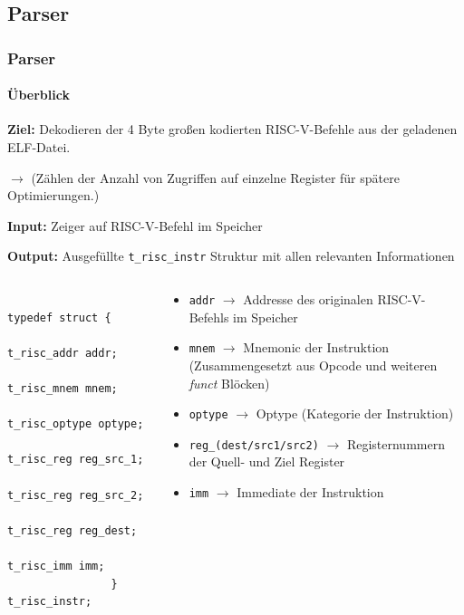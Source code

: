 \documentclass[german]{tum-presentation}
\newcommand{\refer}[0]{\ensuremath{\rightarrow} }
\begin{document}
\subsection{Parser} %
\begin{frame}[fragile]
	\frametitle{Parser}
	\framesubtitle{Überblick}
	\textbf{Ziel:} Dekodieren der 4 Byte großen kodierten RISC-V-Befehle aus der geladenen ELF-Datei.

	\refer (Zählen der Anzahl von Zugriffen auf einzelne Register für spätere Optimierungen.)

	\vspace{0.25cm}
	\textbf{Input:} Zeiger auf RISC-V-Befehl im Speicher

	\textbf{Output:} Ausgefüllte \verb!t_risc_instr! Struktur mit allen relevanten Informationen
	
	\pause

	\begin{columns}
		\begin{column}{0.4\textwidth}
			\begin{lstlisting}
				typedef struct {
				    t_risc_addr addr;
				    t_risc_mnem mnem;
				    t_risc_optype optype;
				    t_risc_reg reg_src_1;
				    t_risc_reg reg_src_2;
				    t_risc_reg reg_dest;
				    t_risc_imm imm;
				} t_risc_instr;
			\end{lstlisting}
		\end{column}
		\begin{column}{0.6\textwidth}
			\vspace{0.25cm}
			\begin{itemize}
				\item \verb!addr! \refer Addresse des originalen RISC-V-Befehls im Speicher				
				\item \verb!mnem! \refer Mnemonic der Instruktion (Zusammengesetzt aus Opcode und weiteren \textit{funct} Blöcken)
				\item \verb!optype! \refer Optype (Kategorie der Instruktion)
				\item \verb!reg_(dest/src1/src2)! \refer Registernummern der Quell- und Ziel Register
				\item \verb!imm! \refer Immediate der Instruktion
			\end{itemize}
		\end{column}
	\end{columns}


\end{frame}
\end{document}
